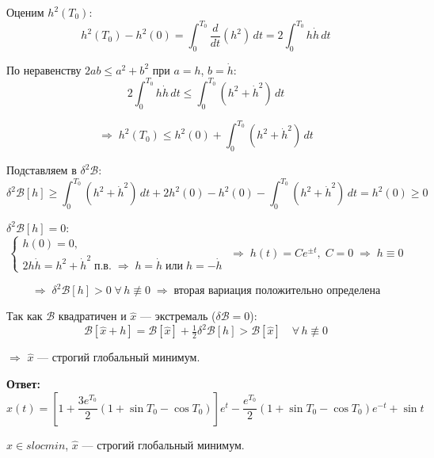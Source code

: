 \documentclass[12pt,a4paper,fleqn]{article}
\begin{document}
Оценим $h^2(T_0)$:
\[
h^2(T_0)-h^2(0)=\int_0^{T_0}\frac{d}{dt}(h^2)\,dt=2\int_0^{T_0}h\dot h\,dt
\]

По неравенству $2ab\leq a^2+b^2$ при $a=h$, $b=\dot h$:
\[
2\int_0^{T_0}h\dot h\,dt\leq\int_0^{T_0}(h^2+\dot h^2)\,dt
\]

\[
\Rightarrow\;h^2(T_0)\leq h^2(0)+\int_0^{T_0}(h^2+\dot h^2)\,dt
\]

Подставляем в $\delta^2 \mathcal{B}$:
\[
\delta^2 \mathcal{B}[h]\geq\int_0^{T_0}(h^2+\dot h^2)\,dt+2h^2(0)-h^2(0)-\int_0^{T_0}(h^2+\dot h^2)\,dt=h^2(0)\geq 0
\]

$\delta^2 \mathcal{B}[h]=0$:
\[
\begin{cases}
h(0)=0,\\
2h\dot h=h^2+\dot h^2\;\text{п.в.}\;\Rightarrow\;h=\dot h\;\text{или}\;h=-\dot h
\end{cases}
\;\Rightarrow\;h(t)=Ce^{\pm t},\;C=0\;\Rightarrow\;h\equiv 0
\]

\[
\Rightarrow\;\delta^2 \mathcal{B}[h]>0\;\forall\,h\not\equiv 0\;\Rightarrow\;\text{вторая вариация положительно определена}
\]

Так как $\mathcal{B}$ квадратичен и $\hat x$ — экстремаль ($\delta \mathcal{B}=0$):
\[
\mathcal{B}[\hat x+h]=\mathcal{B}[\hat x]+\tfrac12\delta^2 \mathcal{B}[h]>\mathcal{B}[\hat x]\quad\forall\,h\not\equiv 0
\]

$\Rightarrow$ $\hat x$ — строгий глобальный минимум.

\bigskip
\textbf{Ответ:}
\[
\hat x(t)=\left[1+\frac{3e^{T_0}}{2}(1+\sin T_0-\cos T_0)\right]e^t-\frac{e^{T_0}}{2}(1+\sin T_0-\cos T_0)e^{-t}+\sin t
\]

$\hat x\in slocmin$, $\hat x$ — строгий глобальный минимум.
\end{document}
